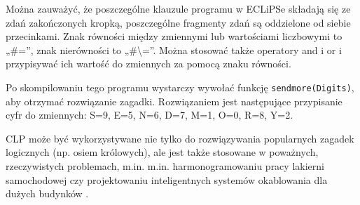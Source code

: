 Można zauważyć, że poszczególne klauzule programu w ECLiPSe składają się ze zdań zakończonych kropką, poszczególne fragmenty zdań są oddzielone od siebie przecinkami. Znak równości między zmiennymi lub wartościami liczbowymi to „\#=”, znak nierówności to „\#\textbackslash=”. Można stosować także operatory and i or i przypisywać ich wartość do zmiennych za pomocą znaku równości. 

Po skompilowaniu tego programu wystarczy wywołać funkcję \texttt{sendmore(Digits)}, aby otrzymać rozwiązanie zagadki. Rozwiązaniem jest następujące przypisanie cyfr do zmiennych: S=9, E=5, N=6, D=7, M=1, O=0, R=8, Y=2. 

CLP może być wykorzystywane nie tylko do rozwiązywania popularnych zagadek logicznych (np. osiem królowych), ale jest także stosowane w poważnych, rzeczywistych problemach, m.in. m.in. harmonogramowaniu pracy lakierni samochodowej czy projektowaniu inteligentnych systemów okablowania dla dużych budynków \cite{niederlinski}.

